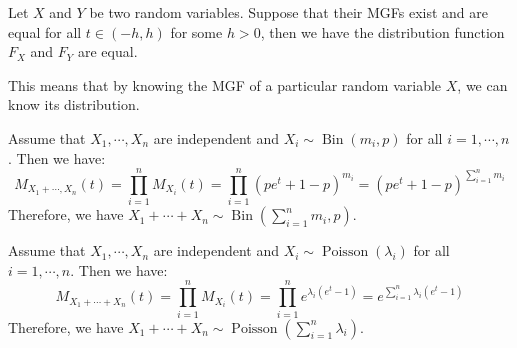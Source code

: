 \documentclass{huhtakm-template-book-v2}
\DeclareMathOperator{\Bin}{Bin}
\DeclareMathOperator{\Poisson}{Poisson}
\begin{document}
\begin{thm}
	Let $X$ and $Y$ be two random variables. Suppose that their MGFs exist and are equal for all $t\in(-h,h)$ for some $h>0$, then we have the distribution function $F_{X}$ and $F_{Y}$ are equal.
\end{thm}
This means that by knowing the MGF of a particular random variable $X$, we can know its distribution.
\begin{eg}
	Assume that $X_{1},\cdots,X_{n}$ are independent and $X_{i}\sim\Bin(m_{i},p)$ for all $i=1,\cdots,n$. Then we have:
	\begin{equation*}
		M_{X_{1}+\cdots,X_{n}}(t)=\prod_{i=1}^{n}M_{X_{i}}(t)=\prod_{i=1}^{n}(pe^{t}+1-p)^{m_{i}}=(pe^{t}+1-p)^{\sum_{i=1}^{n}m_{i}}
	\end{equation*}
	Therefore, we have $X_{1}+\cdots+X_{n}\sim\Bin(\sum_{i=1}^{n}m_{i},p)$.
\end{eg}
\begin{eg}
	Assume that $X_{1},\cdots,X_{n}$ are independent and $X_{i}\sim\Poisson(\lambda_{i})$ for all $i=1,\cdots,n$. Then we have:
	\begin{equation*}
		M_{X_{1}+\cdots+X_{n}}(t)=\prod_{i=1}^{n}M_{X_{i}}(t)=\prod_{i=1}^{n}e^{\lambda_{i}(e^{t}-1)}=e^{\sum_{i=1}^{n}\lambda_{i}(e^{t}-1)}
	\end{equation*}
	Therefore, we have $X_{1}+\cdots+X_{n}\sim\Poisson(\sum_{i=1}^{n}\lambda_{i})$.
\end{eg}
\end{document}
